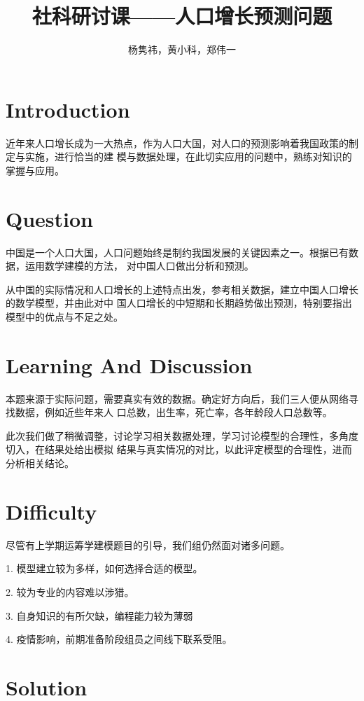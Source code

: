 \documentclass{article}
\title{社科研讨课——人口增长预测问题}
\author{杨隽祎，黄小科，郑伟一}
\begin{document}
\maketitle

\section{Introduction}

近年来人口增长成为一大热点，作为人口大国，对人口的预测影响着我国政策的制定与实施，进行恰当的建
模与数据处理，在此切实应用的问题中，熟练对知识的掌握与应用。

\section{Question}

中国是一个人口大国，人口问题始终是制约我国发展的关键因素之一。根据已有数据，运用数学建模的方法，
对中国人口做出分析和预测。

从中国的实际情况和人口增长的上述特点出发，参考相关数据，建立中国人口增长的数学模型，并由此对中
国人口增长的中短期和长期趋势做出预测，特别要指出模型中的优点与不足之处。


\section{Learning And Discussion}

本题来源于实际问题，需要真实有效的数据。确定好方向后，我们三人便从网络寻找数据，例如近些年来人
口总数，出生率，死亡率，各年龄段人口总数等。

此次我们做了稍微调整，讨论学习相关数据处理，学习讨论模型的合理性，多角度切入，在结果处给出模拟
结果与真实情况的对比，以此评定模型的合理性，进而分析相关结论。

\section{Difficulty}

尽管有上学期运筹学建模题目的引导，我们组仍然面对诸多问题。

1.  模型建立较为多样，如何选择合适的模型。

2.  较为专业的内容难以涉猎。

3.  自身知识的有所欠缺，编程能力较为薄弱

4.  疫情影响，前期准备阶段组员之间线下联系受阻。

\section{Solution}
\end{document}

